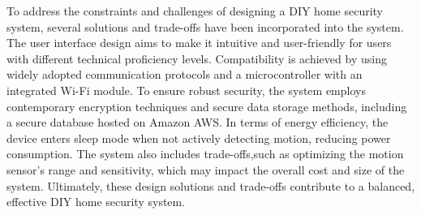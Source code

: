 To address the constraints and challenges of designing a DIY home security system,
several solutions and trade-offs have been incorporated into the system. %
The user interface design aims to make it intuitive and user-friendly for users with different
technical proficiency levels. %
Compatibility is achieved by using widely adopted communication protocols and a microcontroller with an integrated Wi-Fi module. %
To ensure robust security, the system employs contemporary encryption techniques
and secure data storage methods, including a secure database hosted on Amazon AWS\@. %
In terms of energy efficiency, the device enters sleep mode when not actively
detecting motion, reducing power consumption. %
The system also includes trade-offs,such as optimizing the motion sensor's range and sensitivity, which may impact the
overall cost and size of the system. %
Ultimately, these design solutions and trade-offs contribute to a balanced, effective DIY home security system. %
